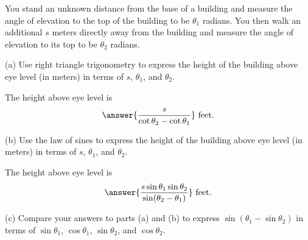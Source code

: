 \documentclass{ximera}
\begin{document}
\begin{question} \label{Q1:SineCosine}
You stand an unknown distance from the base of a building and measure the angle of elevation to the top of the building to be $\theta_1$ radians. You then walk an additional $s$ meters directly away from the building and measure the angle of elevation to its top to be $\theta_2$ radians. 

(a) Use right triangle trigonometry to express the height of the building above eye level (in meters) in terms of $s$, $\theta_1$, and $\theta_2$.


The height above eye level is 
\[
       \answer{\frac{s}{\cot\theta_2-\cot \theta_1}} \text{ feet}.
\]

(b) Use the law of sines to express the height of the building above eye level (in meters) in terms of $s$, $\theta_1$, and $\theta_2$.

The height above eye level is 
\[
       \answer{\frac{s \sin \theta_1 \sin\theta_2}{\sin(\theta_2-\theta_1)}} \text{ feet}.
\]

(c) Compare your answers to parts (a) and (b) to express $\sin(\theta_1 - \sin\theta_2)$ in terms of $\sin\theta_1$, $\cos\theta_1$, $\sin\theta_2$, and $\cos\theta_2$.

\end{question}
\end{document}
